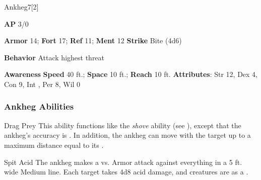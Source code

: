 \begin{monsection}{Ankheg}{7}[2]
\vspace{-1em}\vspace{-1em}
\begin{spellcontent}
\begin{spelltargetinginfo}
{\textbf{AP} 3/0}

\pari \textbf{Armor} 14;
\textbf{Fort} 17;
\textbf{Ref} 11;
\textbf{Ment} 12
\pari \textbf{Strike} Bite  (4d6)



\pari \textbf{Behavior} Attack highest threat
\end{spelltargetinginfo}
\end{spellcontent}

\begin{monsterfooter}
\pari \textbf{Awareness} 
\pari \textbf{Speed} 40 ft.;
\textbf{Space} 10 ft.;
\textbf{Reach} 10 ft.
\pari \textbf{Attributes}:
Str 12,
Dex 4,
Con 9,
Int ,
Per 8,
Wil 0
\end{monsterfooter}
\end{monsection}


\subsubsection{Ankheg Abilities}

\begin{freeability}{Drag Prey}
This ability functions like the \textit{shove} ability (see ), except that the ankheg's accuracy is .
In addition, the ankheg can move with the target up to a maximum distance equal to its .
\end{freeability}

\vspace{0.5em}
\begin{freeability}{Spit Acid}
The ankheg makes a  vs. Armor attack against everything in a 5 ft. wide Medium line.
\hit Each target takes 4d8 acid damage, and creatures are  as a .
\end{freeability}

